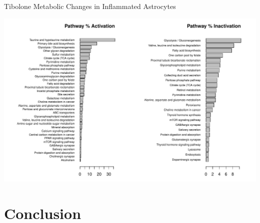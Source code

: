\documentclass[11pt]{beamer}
\begin{document}
\begin{frame}{Tibolone Metabolic Changes in Inflammated Astrocytes}
\begin{center}
\includegraphics[width=\textwidth]{Inflammated2Tibolone}
\end{center}
\end{frame}
\section{Conclusion}
\begin{frame}

\end{frame}
\end{document}
